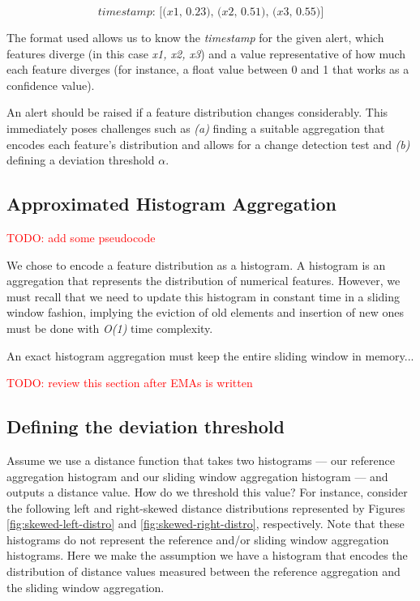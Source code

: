 \[\textit{timestamp: [(x1, 0.23), (x2, 0.51), (x3, 0.55)}]\]

The format used allows us to know the \textit{timestamp} for the given alert, which features diverge (in this case \textit{x1, x2, x3}) and a value representative of how much each feature diverges (for instance, a float value between 0 and 1 that works as a confidence value). 

An alert should be raised if a feature distribution changes considerably. This immediately poses challenges such as \textit{(a)} finding a suitable aggregation that encodes each feature's distribution and allows for a change detection test and \textit{(b)} defining a deviation threshold $\alpha$.

\subsection*{Approximated Histogram Aggregation} \label{sec:ema-hist}
\textcolor{red}{TODO: add some pseudocode}


We chose to encode a feature distribution as a histogram. A histogram is an aggregation that represents the distribution of numerical features. However, we must recall that we need to update this histogram in constant time in a sliding window fashion, implying the eviction of old elements and insertion of new ones must be done with \textit{O(1)} time complexity.

An exact histogram aggregation must keep the entire sliding window in memory...

\textcolor{red}{TODO: review this section after EMAs is written}

\subsection*{Defining the deviation threshold}

Assume we use a distance function that takes two histograms --- our reference aggregation histogram and our sliding window aggregation histogram --- and outputs a distance value. How do we threshold this value? For instance, consider the following left and right-skewed distance distributions represented by Figures \ref{fig:skewed-left-distro} and \ref{fig:skewed-right-distro}, respectively. Note that these histograms do not represent the reference and/or sliding window aggregation histograms. Here we make the assumption we have a histogram that encodes the distribution of distance values measured between the reference aggregation and the sliding window aggregation.

